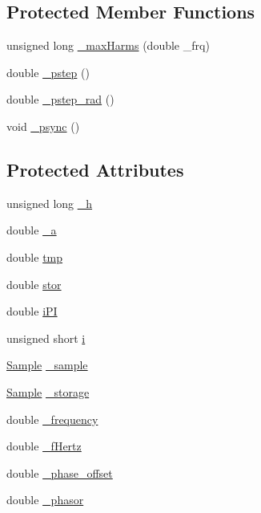 \subsection*{Protected Member Functions}
\begin{DoxyCompactItemize}
\item 
unsigned long \hyperlink{classSignal_1_1Fourier_1_1FourierGenerator_a99720416bd9ff96636f4acf956a785d5}{\+\_\+max\+Harms} (double \+\_\+frq)
\item 
double \hyperlink{classSignal_1_1SignalGenerator_a43b0eec84ee7df04c947533c0511c2c0}{\+\_\+pstep} ()
\item 
double \hyperlink{classSignal_1_1SignalGenerator_abf2f4ab977c6e84bf85022eab8135304}{\+\_\+pstep\+\_\+rad} ()
\item 
void \hyperlink{classSignal_1_1SignalGenerator_a563f57d4dfd8728a6a572f15c1e2532b}{\+\_\+psync} ()
\end{DoxyCompactItemize}
\subsection*{Protected Attributes}
\begin{DoxyCompactItemize}
\item 
unsigned long \hyperlink{classSignal_1_1Fourier_1_1Square_a289e48f696976033845c704970e4de80}{\+\_\+h}
\item 
double \hyperlink{classSignal_1_1Fourier_1_1Square_a1de35055cfcab4d4bae2d72273c34f3f}{\+\_\+a}
\item 
double \hyperlink{classSignal_1_1Fourier_1_1Square_a4fd9ac83ead8150ace9aadffb7c9e47f}{tmp}
\item 
double \hyperlink{classSignal_1_1Fourier_1_1Square_a47ec083d36cef49c7d6583c8741b7905}{stor}
\item 
double \hyperlink{classSignal_1_1Fourier_1_1Square_a78d566d8c876456c115c9160ea0eacd2}{i\+P\+I}
\item 
unsigned short \hyperlink{classSignal_1_1Fourier_1_1Square_a942768cca477bd9bfc71f9a3ea1be8e5}{i}
\item 
\hyperlink{classSignal_1_1Sample}{Sample} \hyperlink{classSignal_1_1Fourier_1_1FourierGenerator_ad720bf2b268dc621ace64c54c0816597}{\+\_\+sample}
\item 
\hyperlink{classSignal_1_1Sample}{Sample} \hyperlink{classSignal_1_1Fourier_1_1FourierGenerator_ab6e6b79cf56e31c9a1b5766f357f8cfb}{\+\_\+storage}
\item 
double \hyperlink{classSignal_1_1SignalGenerator_a7f107461333bce68c5dad412db96a8c2}{\+\_\+frequency}
\item 
double \hyperlink{classSignal_1_1SignalGenerator_a85a4702347352bab1c71e0a8df8437d6}{\+\_\+f\+Hertz}
\item 
double \hyperlink{classSignal_1_1SignalGenerator_a6b4444d46747c8517171edbbf4b5588f}{\+\_\+phase\+\_\+offset}
\item 
double \hyperlink{classSignal_1_1SignalGenerator_af4aa0728ded00777be26a06d883eaeb3}{\+\_\+phasor}
\end{DoxyCompactItemize}


